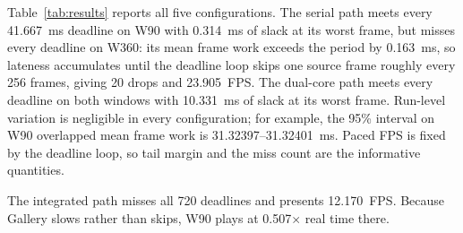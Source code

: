 \documentclass[11pt,twocolumn]{article}
\newcommand{\system}{RV565}
\begin{document}
\begin{table}[!t]
\centering
\caption{Measured \system{} v6 frame work.  Standalone rows pool ten runs of
720 frames; the integrated row is one 720-frame run.  Integrated playback does
not skip frames when late, so drops are not applicable (n/a).}
\label{tab:results}
\end{table}

Table~\ref{tab:results} reports all five configurations.  The serial path
meets every 41.667~ms deadline on W90 with 0.314~ms of slack at its worst
frame, but misses every deadline on W360: its mean frame work exceeds the
period by 0.163~ms, so lateness accumulates until the deadline loop skips one
source frame roughly every 256 frames, giving 20 drops and 23.905~FPS.  The
dual-core path meets every deadline on both windows with 10.331~ms of slack
at its worst frame.  Run-level variation is negligible in every
configuration; for example, the 95\% interval on W90 overlapped mean frame
work is 31.32397--31.32401~ms.  Paced FPS is fixed by the deadline loop, so tail
margin and the miss count are the informative quantities.

The integrated path misses all 720 deadlines and presents 12.170~FPS.
Because Gallery slows rather than skips, W90 plays at 0.507$\times$ real
time there.
\end{document}
